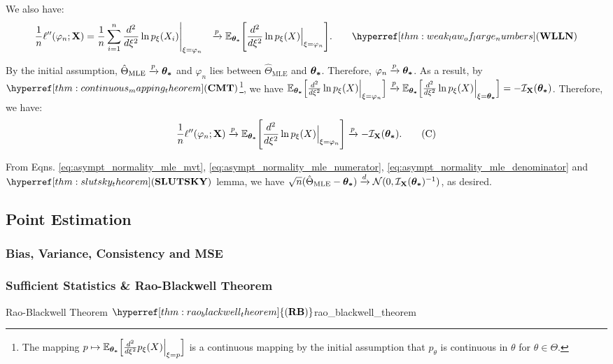 \begin{proof*}
    \noindent We also have:
    \begin{align*}
        \frac{1}{n}\ell''(\varphi_n;\bX) &= \frac{1}{n} \sum_{i=1}^n \frac{d^2}{d\xi^2}\ln p_\xi(X_i)\Bigg|_{\xi=\varphi_n} 
        &\xrightarrow{p} \E_{\btheta}\biggSquare{\frac{d^2}{d\xi^2}\ln p_\xi(X)\Big|_{\xi=\varphi_n}}. \qquad \WLLN
    \end{align*} 

    \noindent By the initial assumption, $\hat\Theta_\mathrm{MLE}\xrightarrow{p}\boldsymbol{\theta_*}$ and $\varphi_n$ lies between $\hat\Theta_\mathrm{MLE}$ and $\boldsymbol{\theta_*}$. Therefore, $\varphi_n\xrightarrow{p}\boldsymbol{\theta_*}$. As a result, by $\CMT$\footnote{The mapping $p\mapsto \mathbb{E}_{\boldsymbol{\theta_*}}\Big[ \frac{d^2}{d\xi^2} p_\xi(X)\Big|_{\xi=p} \Big]$ is a continuous mapping by the initial assumption that $p_\theta$ is continuous in $\theta$ for $\theta\in\Theta$.}, we have $\mathbb{E}_{\boldsymbol{\theta_*}}\Big[ \frac{d^2}{d\xi^2}\ln p_\xi(X)\Big|_{\xi=\varphi_n} \Big]\xrightarrow{p}\mathbb{E}_{\boldsymbol{\theta_*}}\Big[ \frac{d^2}{d\xi^2}\ln p_\xi(X)\Big|_{\xi=\boldsymbol{\theta_*}} \Big] = -\mathcal{I}_{{\bf X}}(\boldsymbol{\theta_*})$. Therefore, we have:
    \begin{equation}
        \label{eq:asympt_normality_mle_denominator} 
        \frac{1}{n}\ell''(\varphi_n;{\bf X}) \xrightarrow{p} \mathbb{E}_{\boldsymbol{\theta_*}}\Bigg[ \frac{d^2}{d\xi^2}\ln p_\xi(X)\Big|_{\xi=\varphi_n} \Bigg] \xrightarrow{p} -\mathcal{I}_{{\bf X}}(\boldsymbol{\theta_*}).\tag{C}
    \end{equation} 

    \noindent From Eqns. \ref{eq:asympt_normality_mle_mvt}, \ref{eq:asympt_normality_mle_numerator}, \ref{eq:asympt_normality_mle_denominator} and $\SLUTSKY$ lemma, we have $\sqrt{n}(\hat\Theta_\mathrm{MLE} - \boldsymbol{\theta_*}) \xrightarrow{d}\mathcal{N}(0, \mathcal{I}_{{\bf X}}(\boldsymbol{\theta_*})^{-1})$, as desired.
\end{proof*}

\subsection{Point Estimation}
\newcommand{\RB}{\hyperref[thm:rao_blackwell_theorem]{(\mathrm{{\bf RB}})}}
\newcommand{\CRLB}{\hyperref[thm:cramer_rao_lowerbound]{(\mathrm{{\bf CRLB}})}}

\subsubsection{Bias, Variance, Consistency and MSE}

\subsubsection{Sufficient Statistics \& Rao-Blackwell Theorem}
\begin{theorem}{Rao-Blackwell Theorem $\RB$}{rao_blackwell_theorem}
     
\end{theorem}


